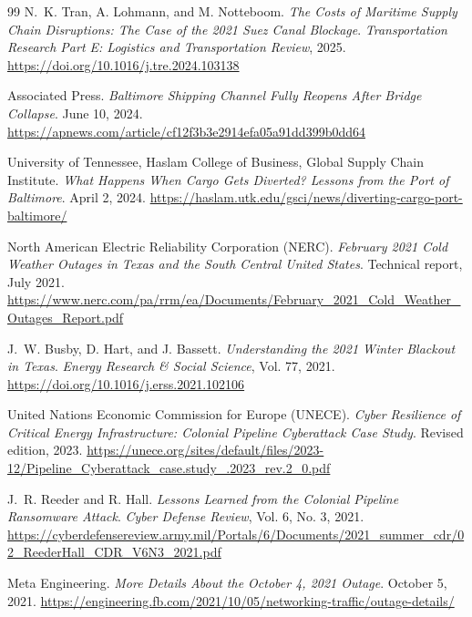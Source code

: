 \documentclass[11pt]{article}
\begin{document}
\begin{thebibliography}{99}
    N.~K. Tran, A. Lohmann, and M. Notteboom.
    \newblock \emph{The Costs of Maritime Supply Chain Disruptions: The Case of the 2021 Suez Canal Blockage}.
    \newblock \emph{Transportation Research Part E: Logistics and Transportation Review}, 2025.
    \newblock \url{https://doi.org/10.1016/j.tre.2024.103138}
    
    Associated Press.
    \newblock \emph{Baltimore Shipping Channel Fully Reopens After Bridge Collapse}.
    \newblock June 10, 2024.
    \newblock \url{https://apnews.com/article/cf12f3b3e2914efa05a91dd399b0dd64}
    
    University of Tennessee, Haslam College of Business, Global Supply Chain Institute.
    \newblock \emph{What Happens When Cargo Gets Diverted? Lessons from the Port of Baltimore}.
    \newblock April 2, 2024.
    \newblock \url{https://haslam.utk.edu/gsci/news/diverting-cargo-port-baltimore/}
    
    North American Electric Reliability Corporation (NERC).
    \newblock \emph{February 2021 Cold Weather Outages in Texas and the South Central United States}.
    \newblock Technical report, July 2021.
    \newblock \url{https://www.nerc.com/pa/rrm/ea/Documents/February_2021_Cold_Weather_Outages_Report.pdf}
    
    J.~W. Busby, D. Hart, and J. Bassett.
    \newblock \emph{Understanding the 2021 Winter Blackout in Texas}.
    \newblock \emph{Energy Research \& Social Science}, Vol. 77, 2021.
    \newblock \url{https://doi.org/10.1016/j.erss.2021.102106}
    
    United Nations Economic Commission for Europe (UNECE).
    \newblock \emph{Cyber Resilience of Critical Energy Infrastructure: Colonial Pipeline Cyberattack Case Study}.
    \newblock Revised edition, 2023.
    \newblock \url{https://unece.org/sites/default/files/2023-12/Pipeline_Cyberattack_case.study_.2023_rev.2_0.pdf}
    
    J.~R. Reeder and R. Hall.
    \newblock \emph{Lessons Learned from the Colonial Pipeline Ransomware Attack}.
    \newblock \emph{Cyber Defense Review}, Vol. 6, No. 3, 2021.
    \newblock \url{https://cyberdefensereview.army.mil/Portals/6/Documents/2021_summer_cdr/02_ReederHall_CDR_V6N3_2021.pdf}
    
    Meta Engineering.
    \newblock \emph{More Details About the October 4, 2021 Outage}.
    \newblock October 5, 2021.
    \newblock \url{https://engineering.fb.com/2021/10/05/networking-traffic/outage-details/}
    

\end{thebibliography}
\end{document}
